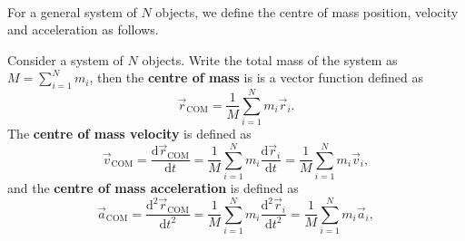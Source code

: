 \documentclass[../newtonian_mechanics.tex]{subfiles}
\begin{document}
        \paragraph{}
        For a general system of $N$ objects, we define the centre of mass position, velocity and acceleration as follows.
        \begin{definition}
            Consider a system of $N$ objects.
            Write the total mass of the system as $M=\sum_{i=1}^N m_i$, then the \textbf{centre of mass} is is a vector function defined as
            \begin{equation}
                \vec{r}_\text{COM} = \frac{1}{M}\sum_{i=1}^N m_i\vec{r}_i.
            \end{equation}
            The \textbf{centre of mass velocity} is defined as
            \begin{equation}
                \vec{v}_\text{COM} = \frac{\mathrm{d}\vec{r}_\text{COM}}{\mathrm{d}t} = \frac{1}{M}\sum_{i=1}^N m_i\frac{\mathrm{d}\vec{r}_i}{\mathrm{d}t} = \frac{1}{M}\sum_{i=1}^N m_i\vec{v}_i,
            \end{equation}
            and the \textbf{centre of mass acceleration} is defined as
            \begin{equation}
                \vec{a}_\text{COM} = \frac{\mathrm{d}^2\vec{r}_\text{COM}}{\mathrm{d}t^2} = \frac{1}{M}\sum_{i=1}^N m_i\frac{\mathrm{d}^2\vec{r}_i}{\mathrm{d}t^2} = \frac{1}{M}\sum_{i=1}^N m_i\vec{a}_i,
            \end{equation}
        \end{definition}
        
\end{document}
